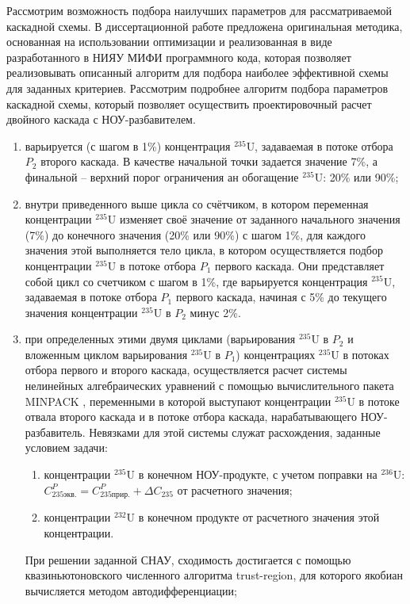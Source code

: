 Рассмотрим возможность подбора наилучших параметров для рассматриваемой каскадной схемы.
В диссертационной работе предложена оригинальная методика, основанная на использовании оптимизации и реализованная в виде разработанного в НИЯУ МИФИ программного кода, которая позволяет реализовывать описанный алгоритм для подбора наиболее эффективной схемы для заданных критериев.
Рассмотрим подробнее алгоритм подбора параметров каскадной схемы, который позволяет осуществить проектировочный расчет двойного каскада с НОУ-разбавителем.

\begin{enumerate}
    \item варьируется (с шагом в 1\%) концентрация $^{235}$U, задаваемая в потоке отбора $P_2$ второго каскада. В качестве начальной точки задается значение 7\%, а финальной -- верхний порог ограничения ан обогащение $^{235}$U: 20\% или 90\%;
    \item внутри приведенного выше цикла со счётчиком, в котором переменная концентрации $^{235}$U изменяет своё значение от заданного начального значения (7\%) до конечного значения (20\% или 90\%) с шагом 1\%, для каждого значения этой выполняется тело цикла, в котором осуществляется подбор концентрации $^{235}$U в потоке отбора $P_1$ первого каскада. Они представляет собой цикл со счетчиком с шагом в 1\%, где варьируется концентрация $^{235}$U, задаваемая в потоке отбора $P_1$ первого каскада, начиная с 5\% до текущего значения концентрации $^{235}$U в $P_2$ минус 2\%.
    \item при определенных этими двумя циклами (варьирования $^{235}$U в $P_2$ и вложенным циклом варьирования $^{235}$U в $P_1$) концентрациях $^{235}$U в потоках отбора первого и второго каскада, осуществляется расчет системы нелинейных алгебраических уравнений с помощью вычислительного пакета MINPACK \cite{moreMINPACK}, переменными в которой выступают концентрации $^{235}$U в потоке отвала второго каскада и в потоке отбора каскада, нарабатывающего НОУ-разбавитель. Невязками для этой системы служат расхождения, заданные условием задачи:
    \begin{enumerate}
        \item концентрации $^{235}$U в  конечном НОУ-продукте, с учетом поправки на $^{236}$U: $C_{235 экв.}^{P}=C_{235 прир.}^{P}+\Delta C_{235}$ от расчетного значения;
        \item концентрации $^{232}$U в конечном продукте от расчетного значения этой концентрации.
    \end{enumerate}
    При решении заданной СНАУ, сходимость достигается с помощью квазиньютоновского численного алгоритма trust-region, для которого якобиан вычисляется методом автодифференциации;

\end{enumerate}
